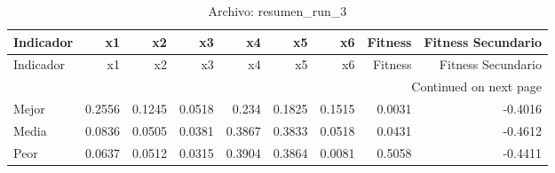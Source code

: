 \begin{longtable}{lrrrrrrrr}
\caption{Archivo: resumen\_run\_3}\label{tab:resumen_run_3} \\
\toprule
Indicador & x1 & x2 & x3 & x4 & x5 & x6 & Fitness & Fitness Secundario \\
\midrule
\endfirsthead
\toprule
Indicador & x1 & x2 & x3 & x4 & x5 & x6 & Fitness & Fitness Secundario \\
\midrule
\endhead
\midrule
\multicolumn{9}{r}{Continued on next page} \\
\midrule
\endfoot
\bottomrule
\endlastfoot
Mejor & 0.2556 & 0.1245 & 0.0518 & 0.234 & 0.1825 & 0.1515 & 0.0031 & -0.4016 \\
Media & 0.0836 & 0.0505 & 0.0381 & 0.3867 & 0.3833 & 0.0518 & 0.0431 & -0.4612 \\
Peor & 0.0637 & 0.0512 & 0.0315 & 0.3904 & 0.3864 & 0.0081 & 0.5058 & -0.4411 \\
\end{longtable}